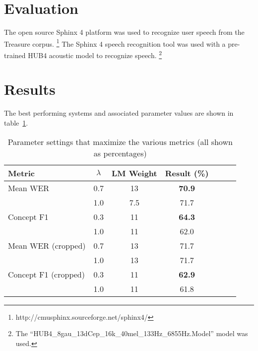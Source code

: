\documentclass{acm_proc_article-sp}
\begin{document}


\section{Evaluation}
The open source Sphinx 4 platform \cite{sphinx4} was used to recognize user speech from the Treasure corpus. \footnote{http://cmusphinx.sourceforge.net/sphinx4/}
The Sphinx 4 speech recognition tool was used with a pre-trained HUB4 acoustic model to recognize speech.
\footnote{The ``HUB4\_8gau\_13dCep\_16k\_40mel\_133Hz\_6855Hz.Model'' model was used.}

\section{Results}
The best performing systems and associated parameter values are shown in table~\ref{bestResults}.

\begin{table}[ht!]
\begin{center}
  \begin{tabular}{ | l | c | c | c | c | c | c | }
    \hline
    Metric & $\lambda$ & LM Weight & Result (\%) \\ \hline \hline
    Mean WER & 0.7 & 13 & {\bf 70.9} \\
                      & 1.0 & 7.5 & 71.7 \\ \hline
    Concept F1 & 0.3 & 11 & {\bf 64.3} \\
                      & 1.0 & 11 & 62.0 \\ \hline
    Mean WER (cropped) & 0.7 & 13 & 71.7 \\
                      & 1.0 & 13 & 71.7 \\ \hline
    Concept F1 (cropped) & 0.3 & 11 & {\bf 62.9} \\
                      & 1.0 & 11 & 61.8 \\ \hline
  \end{tabular}
  \caption{Parameter settings that maximize the various metrics (all shown as percentages)}
  \label{bestResults}
\end{center}
\end{table}
\end{document}
